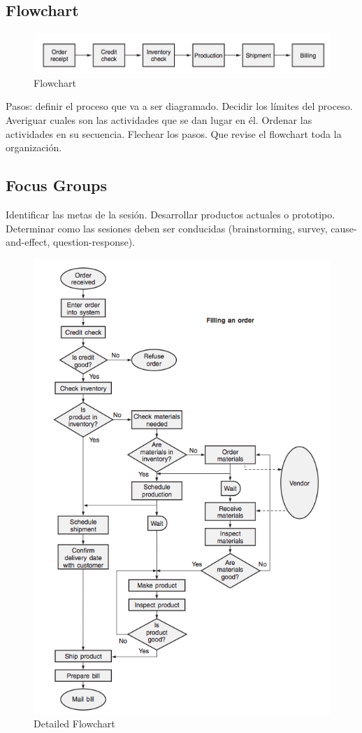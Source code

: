 \documentclass[]{article}
\begin{document}
\subsection{Flowchart}

\begin{figure}[ht!]
	\centering
	\includegraphics[width=120mm]{imagenes/Flowchart.png}
	\caption{Flowchart}
	\label{fig:Flowchart}
\end{figure}

Pasos: definir el proceso que va a ser diagramado. Decidir los límites del proceso. Averiguar cuales son las actividades que se dan lugar en él. Ordenar las actividades en su secuencia. Flechear los pasos. Que revise el flowchart toda la organización.

\subsection{Focus Groups}

Identificar las metas de la sesión. Desarrollar productos actuales o prototipo. Determinar como las sesiones deben ser conducidas (brainstorming, survey, cause-and-effect, question-response).

\begin{figure}[ht!]
	\centering
	\includegraphics[width=120mm]{imagenes/DetailedFlowchart.png}
	\caption{Detailed Flowchart}
	\label{fig:DetailedFlowchart}
\end{figure}
\end{document}
